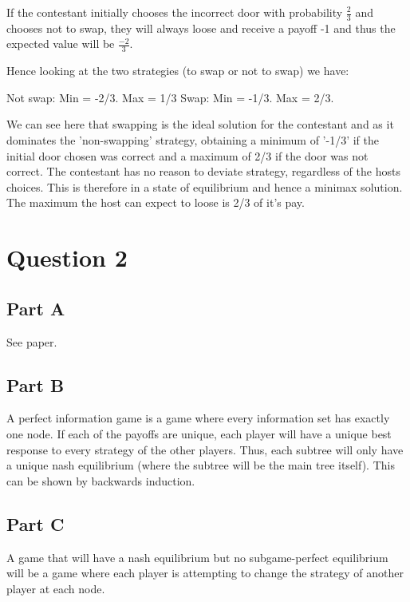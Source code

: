 \documentclass[11pt]{article}
\begin{document}
If the contestant initially chooses the incorrect door with probability $\frac{2}{3}$ and chooses not to swap, they will always loose and receive a payoff -1 and thus the expected value will be $\frac{-2}{3}$.

Hence looking at the two strategies (to swap or not to swap) we have:

Not swap: Min = -2/3. Max = 1/3
Swap: Min = -1/3. Max = 2/3.

We can see here that swapping is the ideal solution for the contestant and as it dominates the 'non-swapping' strategy, obtaining a minimum of '-1/3' if the initial door chosen was correct and a maximum of 2/3 if the door was not correct. The contestant has no reason to deviate strategy, regardless of the hosts choices. This is therefore in a state of equilibrium and hence a minimax solution. The maximum the host can expect to loose is 2/3 of it's pay.

\section{Question 2}

\subsection{Part A}
See paper. 

\subsection{Part B}
A perfect information game is a game where every information set has exactly one node. If each of the payoffs are unique, each player will have a unique best response to every strategy of the other players. Thus, each subtree will only have a unique nash equilibrium (where the subtree will be the main tree itself). This can be shown by backwards induction.

\subsection{Part C}
A game that will have a nash equilibrium but no subgame-perfect equilibrium will be a game where each player is attempting to change the strategy of another player at each node.
\end{document}
